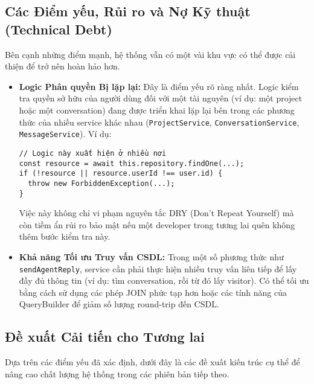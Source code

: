 \subsection{Các Điểm yếu, Rủi ro và Nợ Kỹ thuật (Technical Debt)}
\label{subsec:diem-yeu}

Bên cạnh những điểm mạnh, hệ thống vẫn có một vài khu vực có thể được cải thiện để trở nên hoàn hảo hơn.

\begin{itemize}
    \item \textbf{Logic Phân quyền Bị lặp lại:}
    Đây là điểm yếu rõ ràng nhất. Logic kiểm tra quyền sở hữu của người dùng đối với một tài nguyên (ví dụ: một project hoặc một conversation) đang được triển khai lặp lại bên trong các phương thức của nhiều service khác nhau (\texttt{ProjectService}, \texttt{ConversationService}, \texttt{MessageService}). Ví dụ:
    \begin{verbatim}
// Logic này xuất hiện ở nhiều nơi
const resource = await this.repository.findOne(...);
if (!resource || resource.userId !== user.id) {
  throw new ForbiddenException(...);
}
    \end{verbatim}
    Việc này không chỉ vi phạm nguyên tắc DRY (Don't Repeat Yourself) mà còn tiềm ẩn rủi ro bảo mật nếu một developer trong tương lai quên không thêm bước kiểm tra này.

    \item \textbf{Khả năng Tối ưu Truy vấn CSDL:}
    Trong một số phương thức như \texttt{sendAgentReply}, service cần phải thực hiện nhiều truy vấn liên tiếp để lấy đầy đủ thông tin (ví dụ: tìm conversation, rồi từ đó lấy visitor). Có thể tối ưu bằng cách sử dụng các phép JOIN phức tạp hơn hoặc các tính năng của QueryBuilder để giảm số lượng round-trip đến CSDL.
\end{itemize}

\subsection{Đề xuất Cải tiến cho Tương lai}
\label{subsec:de-xuat-cai-tien}

Dựa trên các điểm yếu đã xác định, dưới đây là các đề xuất kiến trúc cụ thể để nâng cao chất lượng hệ thống trong các phiên bản tiếp theo.

